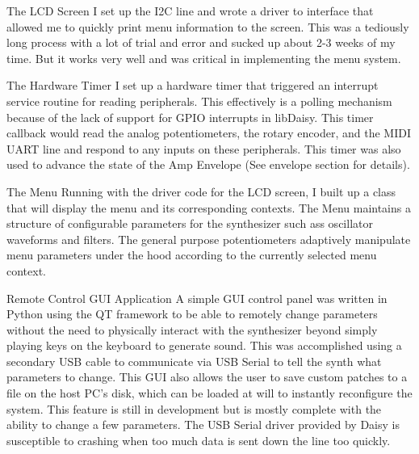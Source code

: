 \documentclass[acmlarge,screen]{acmart}
\begin{document}
The LCD Screen I set up the I2C line and wrote a driver to interface that allowed me to quickly print menu information to the screen. This was a tediously long process with a lot of trial and error and sucked up about 2-3 weeks of my time. But it works very well and was critical in implementing the menu system.

The Hardware Timer I set up a hardware timer that triggered an interrupt service routine for reading peripherals. This effectively is a polling mechanism because of the lack of support for GPIO interrupts in libDaisy. This timer callback would read the analog potentiometers, the rotary encoder, and the MIDI UART line and respond to any inputs on these peripherals. This timer was also used to advance the state of the Amp Envelope (See envelope section for details).

The Menu Running with the driver code for the LCD screen, I built up a class that will display the menu and its corresponding contexts. The Menu maintains a structure of configurable parameters for the synthesizer such ass oscillator waveforms and filters. The general purpose potentiometers adaptively manipulate menu parameters under the hood according to the currently selected menu context.

Remote Control GUI Application A simple GUI control panel was written in Python using the QT framework to be able to remotely change parameters without the need to physically interact with the synthesizer beyond simply playing keys on the keyboard to generate sound. This was accomplished using a secondary USB cable to communicate via USB Serial to tell the synth what parameters to change. This GUI also allows the user to save custom patches to a file on the host PC's disk, which can be loaded at will to instantly reconfigure the system. This feature is still in development but is mostly complete with the ability to change a few parameters. The USB Serial driver provided by Daisy is susceptible to crashing when too much data is sent down the line too quickly.
\end{document}
